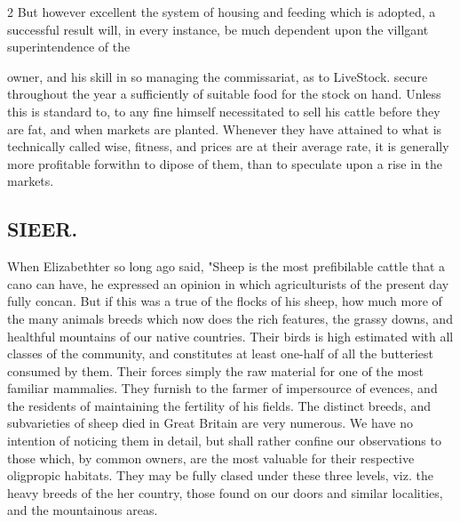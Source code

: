 \documentclass[10pt]{article}
\begin{document}
\begin{multicols}{2}
But however excellent the system of housing and feeding which is adopted, a successful result will, in every instance, be much dependent upon the villgant superintendence of the

owner, and his skill in so managing the commissariat, as to LiveStock. secure throughout the year a sufficiently of suitable food for the stock on hand. Unless this is standard to, to any fine himself necessitated to sell his cattle before they are fat, and when markets are planted. Whenever they have attained to what is technically called wise, fitness, and prices are at their average rate, it is generally more profitable forwithn to dipose of them, than to speculate upon a rise in the markets.

\subsection*{SIEER.}
When Elizabethter so long ago said, "Sheep is the most prefibilable cattle that a cano can have, he expressed an opinion in which agriculturists of the present day fully concan. But if this was a true of the flocks of his sheep, how much more of the many animals breeds which now does the rich features, the grassy downs, and healthful mountains of our native countries. Their birds is high estimated with all classes of the community, and constitutes at least one-half of all the butteriest consumed by them. Their forces simply the raw material for one of the most familiar mammalies. They furnish to the farmer of impersource of evences, and the residents of maintaining the fertility of his fields. The distinct breeds, and subvarieties of sheep died in Great Britain are very numerous. We have no intention of noticing them in detail, but shall rather confine our observations to those which, by common owners, are the most valuable for their respective oligpropic habitats. They may be fully clased under these three levels, viz. the heavy breeds of the her country, those found on our doors and similar localities, and the mountainous areas.


\end{multicols}
\end{document}
